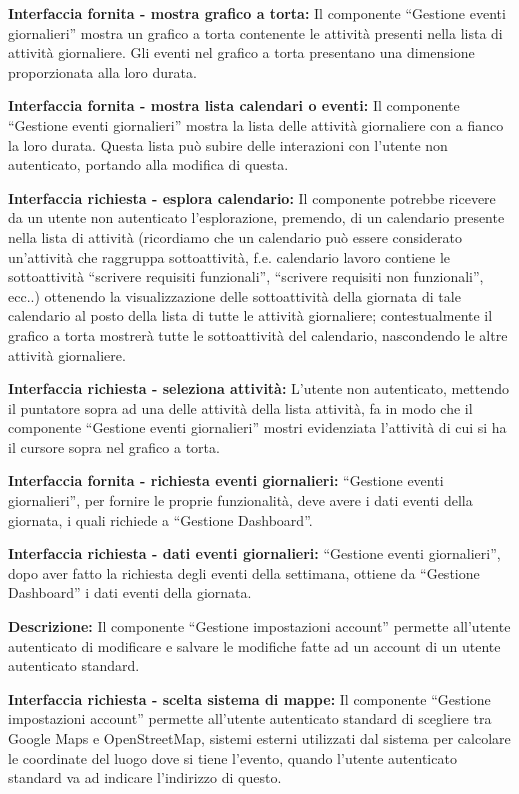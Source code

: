 \begin{listaPersonale}[]{}
    \textbf{Interfaccia fornita - mostra grafico a torta:} Il componente “Gestione eventi giornalieri” mostra un grafico a torta contenente le attività presenti nella lista di attività giornaliere. Gli eventi nel grafico a torta presentano una dimensione proporzionata alla loro durata.

    \textbf{Interfaccia fornita - mostra lista calendari o eventi:} Il componente “Gestione eventi giornalieri” mostra la lista delle attività giornaliere con a fianco la loro durata. Questa lista può subire delle interazioni con l'utente non autenticato, portando alla modifica di questa.

    \textbf{Interfaccia richiesta - esplora calendario:} Il componente potrebbe ricevere da un utente non autenticato l'esplorazione, premendo, di un calendario presente nella lista di attività (ricordiamo che un calendario può essere considerato un'attività che raggruppa sottoattività, f.e. calendario lavoro contiene le sottoattività “scrivere requisiti funzionali”, “scrivere requisiti non funzionali”, ecc..) ottenendo la visualizzazione delle sottoattività della giornata di tale calendario al posto della lista di tutte le attività giornaliere; contestualmente il grafico a torta mostrerà tutte le sottoattività del calendario, nascondendo le altre attività giornaliere.

    \textbf{Interfaccia richiesta - seleziona attività:} L'utente non autenticato, mettendo il puntatore sopra ad una delle attività della lista attività, fa in modo che il componente “Gestione eventi giornalieri” mostri evidenziata l'attività di cui si ha il cursore sopra nel grafico a torta.

    \textbf{Interfaccia fornita - richiesta eventi giornalieri:} “Gestione eventi giornalieri”, per fornire le proprie funzionalità, deve avere i dati eventi della giornata, i quali richiede a “Gestione Dashboard”.

    \textbf{Interfaccia richiesta - dati eventi giornalieri:} “Gestione eventi giornalieri”, dopo aver fatto la richiesta degli eventi della settimana, ottiene da “Gestione Dashboard” i dati eventi della giornata.



    \textbf{Descrizione:} Il componente “Gestione impostazioni account” permette all'utente autenticato di modificare e salvare le modifiche fatte ad un account di un utente autenticato standard.

    \textbf{Interfaccia richiesta - scelta sistema di mappe:} Il componente “Gestione impostazioni account” permette all'utente autenticato standard di scegliere tra Google Maps e OpenStreetMap, sistemi esterni utilizzati dal sistema per calcolare le coordinate del luogo dove si tiene l'evento, quando l'utente autenticato standard va ad indicare l'indirizzo di questo.


\end{listaPersonale}
